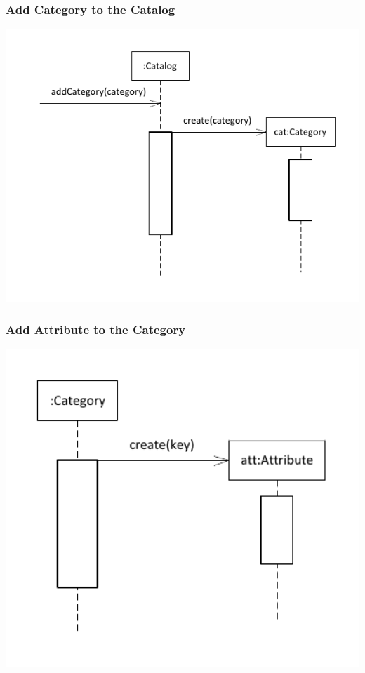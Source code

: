 \documentclass{article}
\begin{document}
\subsubsection{Add Category to the Catalog}
\includegraphics[keepaspectratio, width=6in]{sd_catalog_add_category.pdf}\\

\subsubsection{Add Attribute to the Category}
\includegraphics[keepaspectratio, width=6in]{sd_category_add_attribute.pdf}\\
\end{document}
